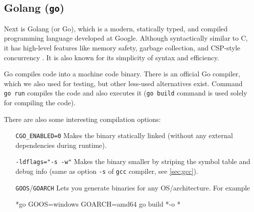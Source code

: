 


\subsection{Golang (\texttt{go})}


Next is Golang (or Go), which is a modern, statically typed, and compiled programming language developed at Google. Although syntactically similar to C, it has high-level features like memory safety, garbage collection, and CSP-style concurrency \cite{go-doc}. It is also known for its simplicity of syntax and efficiency.

Go compiles code into a machine code binary. There is an official Go compiler, which we also used for testing, but other less-used alternatives exist. Command \texttt{go run} compiles the code and also executes it (\texttt{go build} command is used solely for compiling the code).


There are also some interesting compilation options:

\setlength{\leftmargini}{10em}
\begin{itemize}
\item[\texttt{CGO\_ENABLED=0}] Makes the binary statically linked (without any external dependencies during runtime).
\item[\texttt{-ldflags="-s -w"}] Makes the binary smaller by striping the symbol table and debug info (same as option \texttt{-s} of \texttt{gcc} compiler, see \cref{sec:gcc}).
\item[\texttt{GOOS}/\texttt{GOARCH}] Lets you generate binaries for any OS/architecture. For example
\begin{cmdline}{*}{go}{}
GOOS=windows GOARCH=amd64 go build *\codefile* -o *\tmp*
\end{cmdline}
\end{itemize}
\setlength{\leftmargini}{2.5em}


